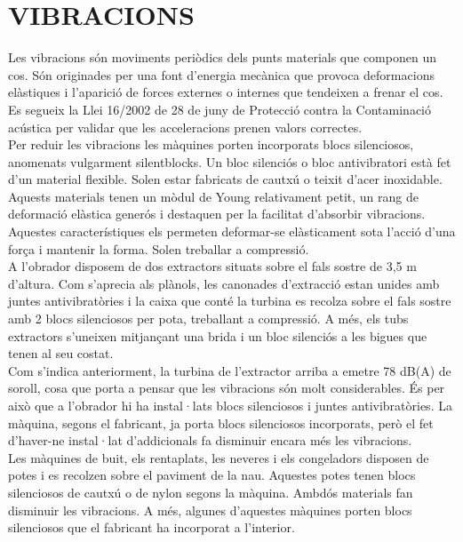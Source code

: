 \section{\uppercase{Vibracions}}
Les vibracions són moviments periòdics dels punts materials que componen un cos. Són originades per una font d'energia mecànica que provoca deformacions elàstiques i l'aparició de forces externes o internes que tendeixen a frenar el cos.\\
\newline Es segueix la Llei 16/2002 de 28 de juny de Protecció contra la Contaminació acústica per validar que les acceleracions prenen valors correctes.\\
\newline Per reduir les vibracions les màquines porten incorporats blocs silenciosos, anomenats vulgarment silentblocks. Un bloc silenciós o bloc antivibratori està fet d'un material flexible. Solen estar fabricats de cautxú o teixit d'acer inoxidable. Aquests materials tenen un mòdul de Young relativament petit, un rang de deformació elàstica generós i destaquen per la facilitat d'absorbir vibracions. Aquestes característiques els permeten deformar-se elàsticament sota l'acció d'una força i mantenir la forma. Solen treballar a compressió.\\
\newline A l'obrador disposem de dos extractors situats sobre el fals sostre de 3,5 m d'altura. Com s'aprecia als plànols, les canonades d'extracció estan unides amb juntes antivibratòries i la caixa que conté la turbina es recolza sobre el fals sostre amb 2 blocs silenciosos per pota, treballant a compressió. A més, els tubs extractors s'uneixen mitjançant una brida i un bloc silenciós a les bigues que tenen al seu costat.\\
\newline Com s'indica anteriorment, la turbina de l'extractor arriba a emetre 78 dB(A) de soroll, cosa que porta a pensar que les vibracions són molt considerables. És per això que a l'obrador hi ha instal·lats blocs silenciosos i juntes antivibratòries. La màquina, segons el fabricant, ja porta blocs silenciosos incorporats, però el fet d'haver-ne instal·lat d'addicionals fa disminuir encara més les vibracions.\\
\newline Les màquines de buit, els rentaplats, les neveres i els congeladors disposen de potes i es recolzen sobre el paviment de la nau. Aquestes potes tenen blocs silenciosos de cautxú o de nylon segons la màquina. Ambdós materials fan disminuir les vibracions. A més, algunes d'aquestes màquines porten blocs silenciosos que el fabricant ha incorporat a l'interior.\\
